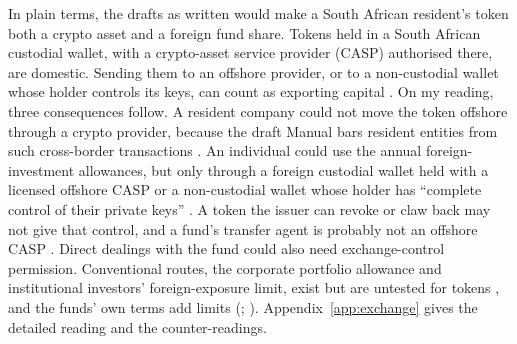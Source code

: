 \documentclass[12pt,a4paper]{article}
\begin{document}
In plain terms, the drafts as written would make a South African resident's token both a crypto asset and a foreign fund share. Tokens held in a South African custodial wallet, with a crypto-asset service provider (CASP) authorised there, are domestic. Sending them to an offshore provider, or to a non-custodial wallet whose holder controls its keys, can count as exporting capital \citep[A.1, pp.~8--9; B.1(A)(ii), p.~24]{SARB2026CryptoManual}. On my reading, three consequences follow. A resident company could not move the token offshore through a crypto provider, because the draft Manual bars resident entities from such cross-border transactions \citep[B.1(C)(iii)(b)(dd), p.~31]{SARB2026CryptoManual}. An individual could use the annual foreign-investment allowances, but only through a foreign custodial wallet held with a licensed offshore CASP or a non-custodial wallet whose holder has ``complete control of their private keys'' \citep[A.1, p.~8; B.1(C)(iii)(a)(hh), (ii), pp.~28--30]{SARB2026CryptoManual}. A token the issuer can revoke or claw back may not give that control, and a fund's transfer agent is probably not an offshore CASP \citep[A.1, p.~9]{SARB2026CryptoManual}. Direct dealings with the fund could also need exchange-control permission. Conventional routes, the corporate portfolio allowance and institutional investors' foreign-exposure limit, exist but are untested for tokens \citep[B.2(C)(iii), pp.~60--61; B.2(H)(iv), p.~73]{ADManual2026}, and the funds' own terms add limits (\citealp[p.~145]{WisdomTreeTMMDF2025}; \citealp[p.~30]{JPMorganOnChainLTMMF2026}). Appendix~\ref{app:exchange} gives the detailed reading and the counter-readings.
\end{document}
